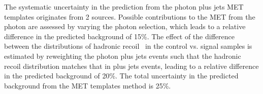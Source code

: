 The systematic uncertainty in the prediction from the photon plus jets MET templates
originates from 2 sources. Possible contributions to the MET from the photon are assessed
by varying the photon selection, which leads to a relative difference in the predicted
background of 15\%. The effect of the difference between the distributions of hadronic recoil \pt\
in the control vs. signal samples is estimated by reweighting the photon plus jets events such
that the hadronic recoil \pt distribution matches that in \Z plus jets events, leading to a relative
difference in the predicted background of 20\%. The total uncertainty in the predicted background
from the MET templates method is 25\%.
